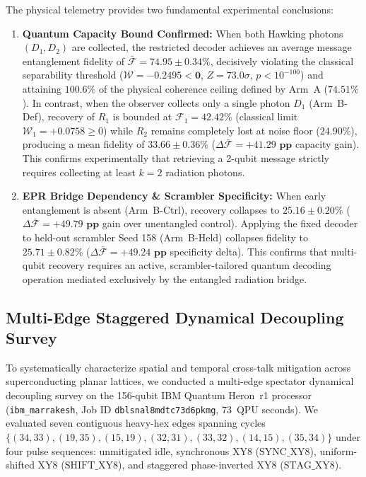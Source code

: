 \documentclass[aps,preprint,superscriptaddress,longbibliography]{revtex4-2}
\begin{document}
The physical telemetry provides two fundamental experimental conclusions:
\begin{enumerate}
\item \textbf{Quantum Capacity Bound Confirmed:} When both Hawking photons $(D_1, D_2)$ are collected, the restricted decoder achieves an average message entanglement fidelity of $\bar{\mathcal{F}} = \mathbf{74.95 \pm 0.34\%}$, decisively violating the classical separability threshold ($\mathcal{W} = \mathbf{-0.2495 < 0}$, $Z = 73.0\sigma$, $p < 10^{-100}$) and attaining $100.6\%$ of the physical coherence ceiling defined by Arm~A ($74.51\%$). In contrast, when the observer collects only a single photon $D_1$ (Arm~B-Def), recovery of $R_1$ is bounded at $\mathcal{F}_1 = 42.42\%$ (classical limit $\mathcal{W}_1 = +0.0758 \ge 0$) while $R_2$ remains completely lost at noise floor ($24.90\%$), producing a mean fidelity of $33.66 \pm 0.36\%$ ($\Delta \bar{\mathcal{F}} = \mathbf{+41.29\text{ pp}}$ capacity gain). This confirms experimentally that retrieving a 2-qubit message strictly requires collecting at least $k = 2$ radiation photons.
\item \textbf{EPR Bridge Dependency \& Scrambler Specificity:} When early entanglement is absent (Arm~B-Ctrl), recovery collapses to $25.16 \pm 0.20\%$ ($\Delta \bar{\mathcal{F}} = \mathbf{+49.79\text{ pp}}$ gain over unentangled control). Applying the fixed decoder to held-out scrambler Seed 158 (Arm~B-Held) collapses fidelity to $25.71 \pm 0.82\%$ ($\Delta \bar{\mathcal{F}} = \mathbf{+49.24\text{ pp}}$ specificity delta). This confirms that multi-qubit recovery requires an active, scrambler-tailored quantum decoding operation mediated exclusively by the entangled radiation bridge.
\end{enumerate}

\subsection{Multi-Edge Staggered Dynamical Decoupling Survey}
\label{sec:dd_survey}

To systematically characterize spatial and temporal cross-talk mitigation across superconducting planar lattices, we conducted a multi-edge spectator dynamical decoupling survey on the 156-qubit IBM Quantum Heron~r1 processor (\texttt{ibm\_marrakesh}, Job ID \texttt{dblsnal8mdtc73d6pkmg}, 73~QPU seconds). We evaluated seven contiguous heavy-hex edges spanning cycles $\{ (34, 33), (19, 35), (15, 19), (32, 31), (33, 32), (14, 15), (35, 34) \}$ under four pulse sequences: unmitigated idle, synchronous XY8 ($\text{SYNC\_XY8}$), uniform-shifted XY8 ($\text{SHIFT\_XY8}$), and staggered phase-inverted XY8 ($\text{STAG\_XY8}$).
\end{document}
